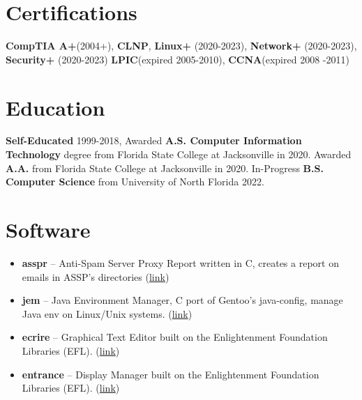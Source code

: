 \documentclass[10pt]{report}
\begin{document}
\section*{Certifications}
\textbf{CompTIA A+}(2004+), \textbf{CLNP}, \textbf{Linux+} (2020-2023), \textbf{Network+} (2020-2023), \textbf{Security+} (2020-2023)\newline
\textbf{LPIC}(expired 2005-2010), \textbf{CCNA}(expired 2008 -2011)

\section*{Education}
\textbf{Self-Educated} 1999-2018, Awarded \textbf{A.S. Computer Information Technology} degree from Florida State College at Jacksonville in 2020. Awarded \textbf{A.A.} from Florida State College at Jacksonville in 2020. In-Progress \textbf{B.S. Computer Science} from University of North Florida 2022.

\section*{Software}
\begin{itemize}
  \item \textbf{asspr} – Anti-Spam Server Proxy Report written in C, creates a report on emails in ASSP's directories (\href{https://github.com/Obsidian-StudiosInc/asspr}{link})
  \item \textbf{jem} – Java Environment Manager, C port of Gentoo's java-config, manage Java env on Linux/Unix systems. (\href{https://github.com/Obsidian-StudiosInc/jem}{link})
  \item \textbf{ecrire} – Graphical Text Editor built on the Enlightenment Foundation Libraries (EFL). (\href{https://github.com/Obsidian-StudiosInc/ecrire}{link})
  \item \textbf{entrance} – Display Manager built on the Enlightenment Foundation Libraries (EFL). (\href{https://github.com/Obsidian-StudiosInc/entrance}{link})
\end{itemize}  
\end{document}
